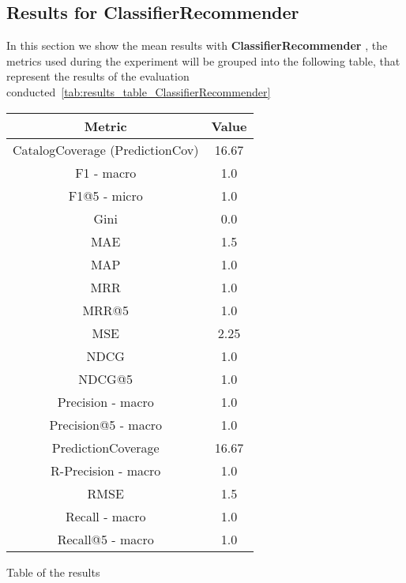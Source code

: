 \documentclass[11pt]{article}
\begin{document}
\hfill\break
\hfill\break



\subsection{Results for ClassifierRecommender}\label{subsec:ClassifierRecommender}
In this section we show the mean results with \textbf{ ClassifierRecommender }, the metrics used during the experiment will be
grouped into the following table, that represent the results of the evaluation conducted~\ref{tab:results_table_ClassifierRecommender}

\begin{center}
    \begin{tabular}{|c|c|}
        \hline
        \textbf{Metric} & \textbf{Value} \\ \hline
                CatalogCoverage (PredictionCov) & 16.67 \\ \hline
                F1 - macro & 1.0 \\ \hline
                F1@5 - micro & 1.0 \\ \hline
                Gini & 0.0 \\ \hline
                MAE & 1.5 \\ \hline
                MAP & 1.0 \\ \hline
                MRR & 1.0 \\ \hline
                MRR@5 & 1.0 \\ \hline
                MSE & 2.25 \\ \hline
                NDCG & 1.0 \\ \hline
                NDCG@5 & 1.0 \\ \hline
                Precision - macro & 1.0 \\ \hline
                Precision@5 - macro & 1.0 \\ \hline
                PredictionCoverage & 16.67 \\ \hline
                R-Precision - macro & 1.0 \\ \hline
                RMSE & 1.5 \\ \hline
                Recall - macro & 1.0 \\ \hline
                Recall@5 - macro & 1.0 \\ \hline
             \end{tabular}
    \captionsetup{type=table}
    \caption{Table of the results}
    \label{tab:results_table_ClassifierRecommender}
\end{center}
\hfill\break
\hfill\break
\end{document}
